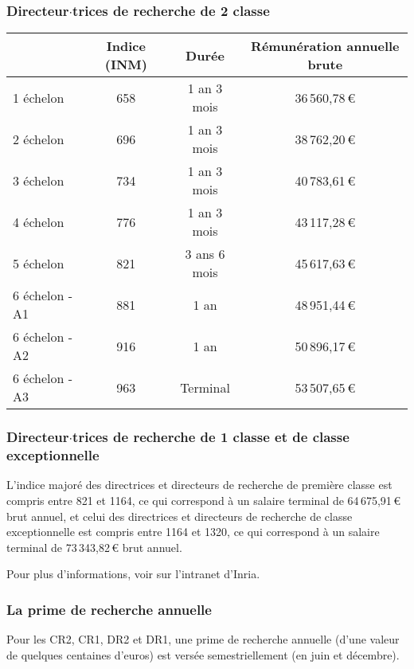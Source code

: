 \subsubsection*{Directeur$\cdot$trices de recherche de 2\ieme{} classe}
\begin{center}
\begin{tabular}{lccc}
\toprule
& Indice (INM)& Dur\'ee& R\'emun\'eration annuelle brute \\
\midrule
1\ier{} \'echelon &658&1 an 3 mois& 36\,560,78\,\euro{} \\

2\ieme{} \'echelon &696&1 an 3 mois&38\,762,20\,\euro{}\\

3\ieme{} \'echelon &734&1 an 3 mois&40\,783,61\,\euro{}\\

4\ieme{} \'echelon &776 &1 an 3 mois&43\,117,28\,\euro{}\\

5\ieme{} \'echelon & 821 & 3 ans 6 mois&45\,617,63\,\euro{}\\

6\ieme{} \'echelon - A1 &881&1 an&48\,951,44\,\euro{}\\

6\ieme{} \'echelon - A2 &916&1 an&50\,896,17\,\euro{}\\

6\ieme{} \'echelon - A3 &963&Terminal &53\,507,65\,\euro{}\\
\bottomrule
\end{tabular}
\end{center}


\subsubsection*{Directeur$\cdot$trices de recherche de 1\iere{}
classe et de classe exceptionnelle}
L'indice major\'e des directrices et directeurs
de recherche de premi\`ere classe est compris entre 821 et 1164, ce
qui correspond \`a un salaire terminal de 64\,675,91\,\euro{} brut
annuel, et celui des directrices et directeurs de recherche de classe
exceptionnelle est compris entre 1164 et 1320, ce qui correspond \`a
un salaire terminal de 73\,343,82\,\euro{} brut annuel.

Pour plus d'informations, voir sur l'intranet d'Inria.
\subsubsection*{La prime de recherche annuelle}
Pour les CR2, CR1, DR2 et DR1, une prime de recherche annuelle (d'une valeur de quelques centaines d'euros) est vers\'ee semestriellement (en juin et d\'ecembre).

